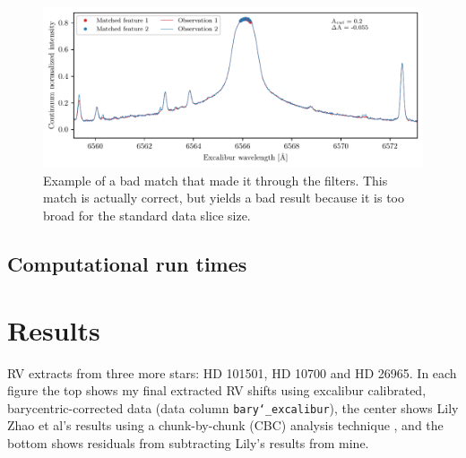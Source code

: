 

\begin{figure}%
    \begin{wide}  
    \includegraphics[scale=0.72]{figures/bad_match_example.pdf}
    \caption{Example of a bad match that made it through the filters. This match is actually correct, but yields a bad result because it is too broad for the standard data slice size.}
    \label{fig:bad_match_example}
\end{wide}
\end{figure}

\subsection{Computational run times}\label{appendix:run_times} 



% 
% 
\newpage
\section{Results}\label{appendix:results}

\small{RV extracts from three more stars: HD 101501, HD 10700 and HD 26965. In each figure the top shows my final extracted RV shifts using excalibur calibrated, barycentric-corrected data (data column \texttt{bary\char`_excalibur}), the center shows Lily Zhao et al's results using a chunk-by-chunk (CBC) analysis technique \cite{yale_data}, and the bottom shows residuals from subtracting Lily's results from mine. }

